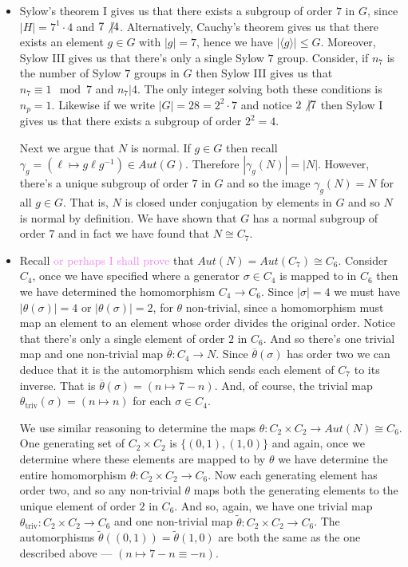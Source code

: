 \documentclass[12pt,letterpaper,boxed]{hmcpset}
\newcommand{\wg}[1]{\textcolor{violet}{#1}}
\newcommand{\abs}[1]{\left|#1\right|}
\newcommand{\inv}{^{-1}}
\begin{document}
\begin{solution}
\begin{itemize}
\item Sylow's theorem I gives us that there exists a subgroup of order
$7$ in $G$, since $\abs{H} = 7^1 \cdot 4$ and $7 \not \vert 4$. 
Alternatively, Cauchy's theorem gives us that there exists an element
$g \in G$ with $\abs{g} = 7$, hence we have $\abs{\langle g \rangle}
\leq G$. Moreover, Sylow III gives us that there's only a single Sylow
$7$ group. Consider, if $n_7$ is the number of Sylow $7$ groups in
$G$ then Sylow III gives us that $n_7 \equiv 1 \mod 7$ and $n_7 \vert
4$. The only integer solving both these conditions is $n_p = 1$. 
Likewise if we write $\abs G = 28 = 2^2 \cdot 7$ and notice $2
\not\vert 7$ then Sylow I gives us that there exists a subgroup of
order $2^2 = 4$.

Next we argue that $N$ is normal. If $g \in G$ then recall $\gamma_g =
(\ell \mapsto g\ell g\inv) \in Aut(G)$. Therefore $\abs{\gamma_g(N)} =
\abs{N}$. However, there's a unique subgroup of order $7$ in $G$ and
so the image $\gamma_g(N) = N$ for all $g \in G$. That is, $N$ is
closed under conjugation by elements in $G$ and so $N$ is normal by
definition. We have shown that $G$ has a normal subgroup of order $7$
and in fact we have found that $N \cong C_7$.


\item Recall \wg{or perhaps I shall prove} that $Aut(N) = Aut(C_7)
\cong C_6$. Consider $C_4$, once we have specified where a generator
$\sigma \in C_4$ is mapped to in $C_6$ then we have determined the
homomorphism $C_4 \to C_6$.
Since $\abs \sigma = 4$ we must have $\abs{\theta(\sigma)} = 4$ or
$\abs{\theta(\sigma)} = 2$, for $\theta$ non-trivial,
 since a homomorphism must map an element
to an element whose order divides the original order.
Notice that there's only a single element of order $2$ in $C_6$. And
so there's one trivial map and one non-trivial map $\overline \theta: C_4
\to N$.
Since $\overline\theta(\sigma)$ has order two we can deduce that it is the
automorphism which sends each element of $C_7$ to its inverse. That is 
$\overline\theta(\sigma) = (n \mapsto 7 - n)$. And, of course, the
trivial map $\theta_{\text{triv}}(\sigma) = (n \mapsto n)$ for each
$\sigma \in C_4$. 

We use similar reasoning to determine the maps $\theta: C_2 \times C_2
\to Aut(N) \cong C_6$. One generating set of $C_2 \times C_2$ is
$\{(0,1), (1,0)\}$ and again, once we determine where these elements
are mapped to by $\theta$ we have determine the entire homomorphism
$\theta: C_2 \times C_2 \to C_6$. Now each generating element has
order two, and so any non-trivial $\theta$ maps both the generating
elements to the unique element of order $2$ in $C_6$. 
And so, again, we have one trivial map $\theta_{\text{triv}}: C_2
\times C_2 \to C_6$ and one non-trivial map $\tilde \theta: C_2 \times
C_2 \to C_6$. The automorphisms $\tilde \theta((0,1)) =
\tilde\theta(1,0)$ are both the same as the one described above ---
$(n \mapsto 7 - n \equiv -n)$.


\end{itemize}
\end{solution}
\end{document}
